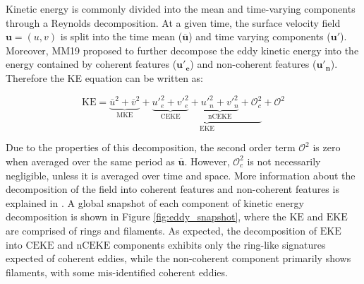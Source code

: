 \documentclass[draft,linenumbers]{agujournal2019}
\newcommand{\mKE}{\textrm{MKE}}
\newcommand{\KE}{\textrm{KE}}
\newcommand{\EKE}{\textrm{EKE}}
\newcommand{\CEKE}{\textrm{CEKE}}
\newcommand{\nCEKE}{\textrm{nCEKE}}
\begin{document}
	Kinetic energy is commonly divided into the mean and time-varying components through a Reynolds decomposition. At a given time, the surface velocity field $\mathbf{u} = (u,v)$ is split into the time mean ($\mathbf{\overline{u}}$) and time varying components ($\mathbf{u'}$). Moreover, MM19 proposed to further decompose the eddy kinetic energy into the energy contained by coherent features ($\mathbf{u'_e}$) and non-coherent features ($\mathbf{u'_n}$). Therefore the KE equation can be written as:
	
	\begin{equation}
		\mathrm{KE} = \underbrace{\overline{u}^2 + \overline{v}^2}_{\mKE} + 
		\underbrace{\underbrace{{u'}_e^2+{v'}_e^2}_{\CEKE}  + \underbrace{{u'}_n^2+{v'}_n^2}_{\nCEKE} + \mathcal{O}_c^2 }_{\EKE} + \mathcal{O}^2
	\end{equation}

	Due to the properties of this decomposition, the second order term $\mathcal{O}^2$ is zero when averaged over the same period as $\mathbf{\overline{u}}$. However, $\mathcal{O}_c^2$ is not necessarily negligible, unless it is averaged over time and space. More information about the decomposition of the field into coherent features and non-coherent features is explained in \citet{Martinez_TKE_2019}. A global snapshot of each component of kinetic energy decomposition is shown in Figure \ref{fig:eddy_snapshot}, where the $\KE$ and $\EKE$ are comprised of rings and filaments. As expected, the decomposition of $\EKE$ into $\CEKE$ and $\nCEKE$ components exhibits only the ring-like signatures expected of coherent eddies, while the non-coherent component primarily shows filaments, with some mis-identified coherent eddies.
\end{document}
